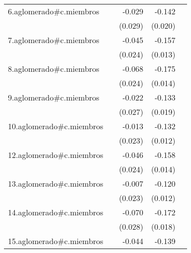 {\begin{longtable}{l*{4}{D{.}{.}{-1}}}
\addlinespace
6.aglomerado#c.miembros&                     &      -0.029         &      -0.142\sym{***}&                     \\
            &                     &     (0.029)         &     (0.020)         &                     \\
\addlinespace
7.aglomerado#c.miembros&                     &      -0.045         &      -0.157\sym{***}&                     \\
            &                     &     (0.024)         &     (0.013)         &                     \\
\addlinespace
8.aglomerado#c.miembros&                     &      -0.068\sym{**} &      -0.175\sym{***}&                     \\
            &                     &     (0.024)         &     (0.014)         &                     \\
\addlinespace
9.aglomerado#c.miembros&                     &      -0.022         &      -0.133\sym{***}&                     \\
            &                     &     (0.027)         &     (0.019)         &                     \\
\addlinespace
10.aglomerado#c.miembros&                     &      -0.013         &      -0.132\sym{***}&                     \\
            &                     &     (0.023)         &     (0.012)         &                     \\
\addlinespace
12.aglomerado#c.miembros&                     &      -0.046         &      -0.158\sym{***}&                     \\
            &                     &     (0.024)         &     (0.014)         &                     \\
\addlinespace
13.aglomerado#c.miembros&                     &      -0.007         &      -0.120\sym{***}&                     \\
            &                     &     (0.023)         &     (0.012)         &                     \\
\addlinespace
14.aglomerado#c.miembros&                     &      -0.070\sym{*}  &      -0.172\sym{***}&                     \\
            &                     &     (0.028)         &     (0.018)         &                     \\
\addlinespace
15.aglomerado#c.miembros&                     &      -0.044         &      -0.139\sym{***}&                     \\

\end{longtable}}
